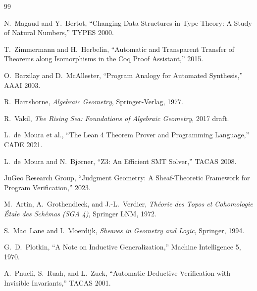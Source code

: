 \documentclass[11pt]{article}
\begin{document}
\begin{thebibliography}{99}

N.~Magaud and Y.~Bertot, ``Changing Data Structures in Type Theory:
A Study of Natural Numbers,'' TYPES 2000.

T.~Zimmermann and H.~Herbelin, ``Automatic and Transparent Transfer of
Theorems along Isomorphisms in the Coq Proof Assistant,'' 2015.

O.~Barzilay and D.~McAllester, ``Program Analogy for Automated
Synthesis,'' AAAI 2003.

R.~Hartshorne, \emph{Algebraic Geometry}, Springer-Verlag, 1977.

R.~Vakil, \emph{The Rising Sea: Foundations of Algebraic Geometry},
2017 draft.

L.~de~Moura et al., ``The Lean 4 Theorem Prover and Programming
Language,'' CADE 2021.

L.~de~Moura and N.~Bj{\o}rner, ``Z3: An Efficient SMT Solver,''
TACAS 2008.

JuGeo Research Group, ``Judgment Geometry: A Sheaf-Theoretic Framework
for Program Verification,'' 2023.

M.~Artin, A.~Grothendieck, and J.-L.~Verdier, \emph{Th\'eorie des Topos
et Cohomologie \'Etale des Sch\'emas (SGA 4)}, Springer LNM, 1972.

S.~Mac~Lane and I.~Moerdijk, \emph{Sheaves in Geometry and Logic},
Springer, 1994.

G.~D.~Plotkin, ``A Note on Inductive Generalization,'' Machine
Intelligence 5, 1970.

A.~Pnueli, S.~Ruah, and L.~Zuck, ``Automatic Deductive Verification
with Invisible Invariants,'' TACAS 2001.

\end{thebibliography}
\end{document}
